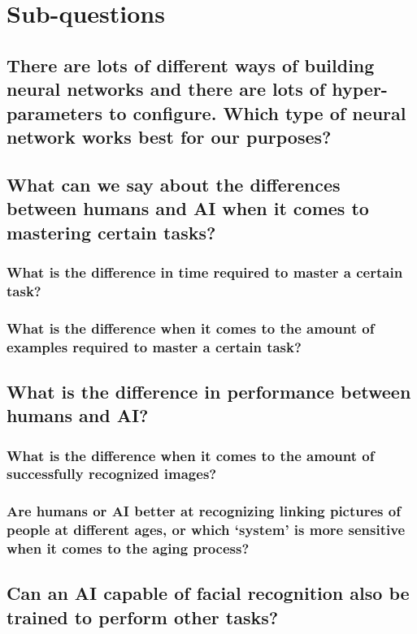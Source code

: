 \documentclass[12pt, titlepage]{article}
\let\oldsection\section
\renewcommand\section{\clearpage\oldsection}
\begin{document}
    \section{Sub-questions}
    
    
    \subsection{There are lots of different ways of building neural networks and there are lots of hyper-parameters to configure. Which type of neural network works best for our purposes?}
    
    \bigskip
    \subsection{What can we say about the differences between humans and AI when it comes to mastering certain tasks?}
    \subsubsection{What is the difference in time required to master a certain task?}
    \subsubsection{What is the difference when it comes to the amount of examples required to master a certain task?}
    
    \bigskip
    \subsection{What is the difference in performance between humans and AI?}
    \subsubsection{What is the difference when it comes to the amount of successfully recognized images?}
    \subsubsection{Are humans or AI better at recognizing linking pictures of people at different ages, or which ‘system’ is more sensitive when it comes to the aging process?}
    
    \bigskip
    \subsection{Can an AI capable of facial recognition also be trained to perform other tasks?}
\end{document}
